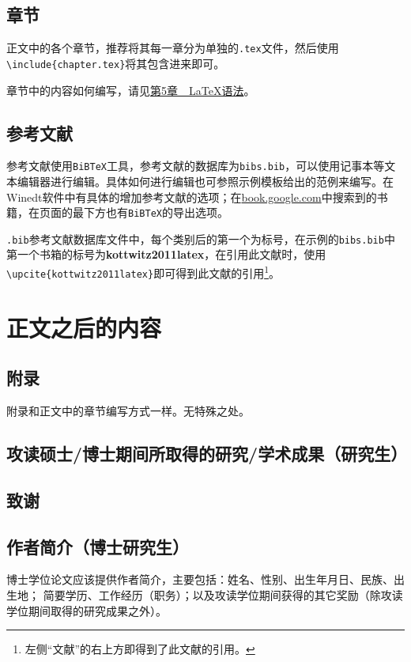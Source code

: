\subsection{章节}
正文中的各个章节，推荐将其每一章分为单独的\texttt{.tex}文件，然后使用\texttt{\textbackslash include\{chapter.tex\}}将其包含进来即可。

章节中的内容如何编写，请见\hyperref[chapter-basic]{第5章~~\LaTeX{}语法}。

\subsection{参考文献}
参考文献使用\texttt{BiBTeX}工具，参考文献的数据库为\texttt{bibs.bib}，可以使用记事本等文本编辑器进行编辑。具体如何进行编辑也可参照示例模板给出的范例来编写。在Winedt软件中有具体的增加参考文献的选项；在\url{book.google.com}中搜索到的书籍，在页面的最下方也有\texttt{BiBTeX}的导出选项。

\texttt{.bib}参考文献数据库文件中，每个类别后的第一个为标号，在示例的\texttt{bibs.bib}中第一个书箱的标号为\textbf{kottwitz2011latex}，在引用此文献时，使用\verb|\upcite{kottwitz2011latex}|即可得到此文献的引用\footnote{左侧“文献”的右上方即得到了此文献的引用。}。

\section{正文之后的内容}
\subsection{附录}
附录和正文中的章节编写方式一样。无特殊之处。
\subsection{攻读硕士\slash 博士期间所取得的研究\slash 学术成果（研究生）}
\subsection{致谢}
\subsection{作者简介（博士研究生）}
博士学位论文应该提供作者简介，主要包括：姓名、性别、出生年月日、民族、出生地；
简要学历、工作经历（职务）；以及攻读学位期间获得的其它奖励（除攻读学位期间取得的研究成果之外）。
